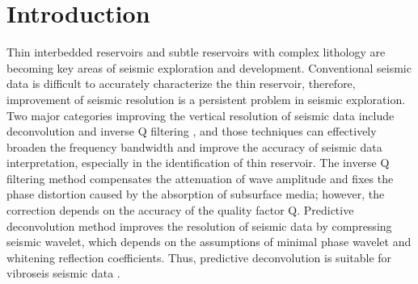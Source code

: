 \section{Introduction}
Thin interbedded reservoirs and subtle reservoirs with complex
lithology are becoming key areas of seismic exploration and
development. Conventional seismic data is difficult to accurately
characterize the thin reservoir, therefore, improvement of seismic
resolution is a persistent problem in seismic exploration. Two major
categories improving the vertical resolution of seismic data include
deconvolution \cite[]{ver08,ver12, Margrave11, Li13} and inverse Q
filtering \cite[]{Wang02, Wang06}, and those techniques can
effectively broaden the frequency bandwidth and improve the accuracy
of seismic data interpretation, especially in the identification of
thin reservoir. The inverse Q filtering method compensates the
attenuation of wave amplitude and fixes the phase distortion caused by
the absorption of subsurface media; however, the correction depends on
the accuracy of the quality factor Q.  Predictive deconvolution method
improves the resolution of seismic data by compressing seismic
wavelet, which depends on the assumptions of minimal phase wavelet and
whitening reflection coefficients. Thus, predictive deconvolution is
suitable for vibroseis seismic data \cite[]{Ristow75}.

